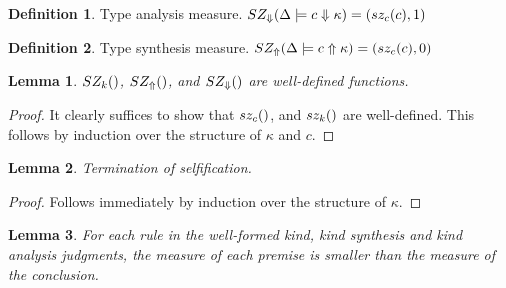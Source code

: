 \documentclass[12pt,twoside,fleqn]{amsart}
\theoremstyle{plain}
\theoremstyle{plain}
\newtheorem{lem}{Lemma}
\theoremstyle{definition}
\newtheorem{defn}{Definition}
\begin{document}
\begin{defn}
Type analysis measure. \( SZ_{\Downarrow }(\Delta   \models c  \Downarrow \kappa   )=(sz_{c}(c ),1) \)
\end{defn}
%

\begin{defn}
Type synthesis measure. \( SZ_{\Uparrow }(\Delta   \models c  \Uparrow \kappa   )=(sz_{c}(c ),0) \)
\end{defn}
\begin{lem}
\( SZ_k() \), \( SZ_{\Uparrow }( ) \), and \( SZ_{\Downarrow }( ) \) are well-defined functions.
\end{lem}
\begin{proof}
It clearly suffices to show that \( sz_{c}( ) \), and \( sz_k() \) are well-defined.
This follows by induction over the structure of \( \kappa  \) and \( c \).
\end{proof}
\begin{lem}
\label{lem:selfificationTerm}Termination of selfification.
\end{lem}
\begin{proof}
Follows immediately by induction over the structure of \( \kappa  \).
\end{proof}
\begin{lem}
\label{lem:ConKindMeasureReduce}For each rule in the well-formed kind, kind
synthesis and kind analysis judgments, the measure of each premise is smaller
than the measure of the conclusion. 
\end{lem}
\end{document}
